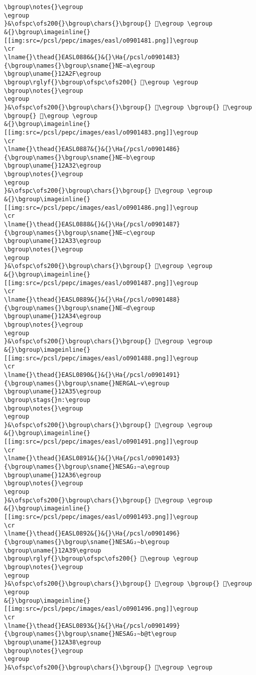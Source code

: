 \begin{verbatim}
\bgroup\notes{}\egroup
\egroup
}&\ofspc\ofs200{}\bgroup\chars{}\bgroup{} 𒨮\egroup \egroup
&{}\bgroup\imageinline{}[[img:src=/pcsl/pepc/images/easl/o0901481.png]]\egroup
\cr
\lname{}\thead{}EASL0886&{}&{}\Ha{/pcsl/o0901483}{\bgroup\names{}\bgroup\sname{}NE∼a\egroup
\bgroup\uname{}12A2F\egroup
\bgroup\rglyf{}\bgroup\ofspc\ofs200{} 𒨯\egroup \egroup
\bgroup\notes{}\egroup
\egroup
}&\ofspc\ofs200{}\bgroup\chars{}\bgroup{} 𒨯\egroup \bgroup{} 𒨰\egroup \bgroup{} 𒨱\egroup \egroup
&{}\bgroup\imageinline{}[[img:src=/pcsl/pepc/images/easl/o0901483.png]]\egroup
\cr
\lname{}\thead{}EASL0887&{}&{}\Ha{/pcsl/o0901486}{\bgroup\names{}\bgroup\sname{}NE∼b\egroup
\bgroup\uname{}12A32\egroup
\bgroup\notes{}\egroup
\egroup
}&\ofspc\ofs200{}\bgroup\chars{}\bgroup{} 𒨲\egroup \egroup
&{}\bgroup\imageinline{}[[img:src=/pcsl/pepc/images/easl/o0901486.png]]\egroup
\cr
\lname{}\thead{}EASL0888&{}&{}\Ha{/pcsl/o0901487}{\bgroup\names{}\bgroup\sname{}NE∼c\egroup
\bgroup\uname{}12A33\egroup
\bgroup\notes{}\egroup
\egroup
}&\ofspc\ofs200{}\bgroup\chars{}\bgroup{} 𒨳\egroup \egroup
&{}\bgroup\imageinline{}[[img:src=/pcsl/pepc/images/easl/o0901487.png]]\egroup
\cr
\lname{}\thead{}EASL0889&{}&{}\Ha{/pcsl/o0901488}{\bgroup\names{}\bgroup\sname{}NE∼d\egroup
\bgroup\uname{}12A34\egroup
\bgroup\notes{}\egroup
\egroup
}&\ofspc\ofs200{}\bgroup\chars{}\bgroup{} 𒨴\egroup \egroup
&{}\bgroup\imageinline{}[[img:src=/pcsl/pepc/images/easl/o0901488.png]]\egroup
\cr
\lname{}\thead{}EASL0890&{}&{}\Ha{/pcsl/o0901491}{\bgroup\names{}\bgroup\sname{}NERGAL∼v\egroup
\bgroup\uname{}12A35\egroup
\bgroup\stags{}n:\egroup
\bgroup\notes{}\egroup
\egroup
}&\ofspc\ofs200{}\bgroup\chars{}\bgroup{} 𒨵\egroup \egroup
&{}\bgroup\imageinline{}[[img:src=/pcsl/pepc/images/easl/o0901491.png]]\egroup
\cr
\lname{}\thead{}EASL0891&{}&{}\Ha{/pcsl/o0901493}{\bgroup\names{}\bgroup\sname{}NESAG₂∼a\egroup
\bgroup\uname{}12A36\egroup
\bgroup\notes{}\egroup
\egroup
}&\ofspc\ofs200{}\bgroup\chars{}\bgroup{} 𒨶\egroup \egroup
&{}\bgroup\imageinline{}[[img:src=/pcsl/pepc/images/easl/o0901493.png]]\egroup
\cr
\lname{}\thead{}EASL0892&{}&{}\Ha{/pcsl/o0901496}{\bgroup\names{}\bgroup\sname{}NESAG₂∼b\egroup
\bgroup\uname{}12A39\egroup
\bgroup\rglyf{}\bgroup\ofspc\ofs200{} 𒨹\egroup \egroup
\bgroup\notes{}\egroup
\egroup
}&\ofspc\ofs200{}\bgroup\chars{}\bgroup{} 𒨷\egroup \bgroup{} 𒨹\egroup \egroup
&{}\bgroup\imageinline{}[[img:src=/pcsl/pepc/images/easl/o0901496.png]]\egroup
\cr
\lname{}\thead{}EASL0893&{}&{}\Ha{/pcsl/o0901499}{\bgroup\names{}\bgroup\sname{}NESAG₂∼b@t\egroup
\bgroup\uname{}12A38\egroup
\bgroup\notes{}\egroup
\egroup
}&\ofspc\ofs200{}\bgroup\chars{}\bgroup{} 𒨸\egroup \egroup

\end{verbatim}
